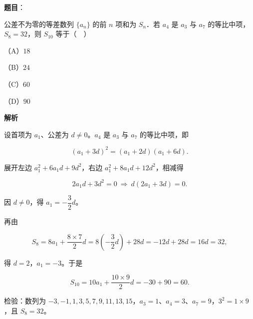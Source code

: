 \begin{answer}

\textbf{题目}：

公差不为零的等差数列 $\{a_n\}$ 的前 $n$ 项和为 $S_n$．若 $a_4$ 是 $a_3$ 与 $a_7$ 的等比中项，$S_8=32$，则 $S_{10}$ 等于（　）

（A）$18$

（B）$24$

（C）$60$

（D）$90$

\textbf{解析}

设首项为 $a_1$、公差为 $d\neq0$。$a_4$ 是 $a_3$ 与 $a_7$ 的等比中项，即

\nopagebreak[4]
\[(a_1+3d)^2=(a_1+2d)(a_1+6d).\]

展开左边 $a_1^2+6a_1d+9d^2$，右边 $a_1^2+8a_1d+12d^2$，相减得

\nopagebreak[4]
\[2a_1d+3d^2=0\ \Longrightarrow\ d(2a_1+3d)=0.\]

因 $d\neq0$，得 $a_1=-\dfrac32d$。

再由

\nopagebreak[4]
\[S_8=8a_1+\frac{8\times7}{2}d=8\left(-\frac32d\right)+28d=-12d+28d=16d=32,\]

得 $d=2$，$a_1=-3$。于是

\nopagebreak[4]
\[S_{10}=10a_1+\frac{10\times9}{2}d=-30+90=60.\]

检验：数列为 $-3,-1,1,3,5,7,9,11,13,15$，$a_3=1$、$a_4=3$、$a_7=9$，$3^2=1\times9$，且 $S_8=32$。


\end{answer}
